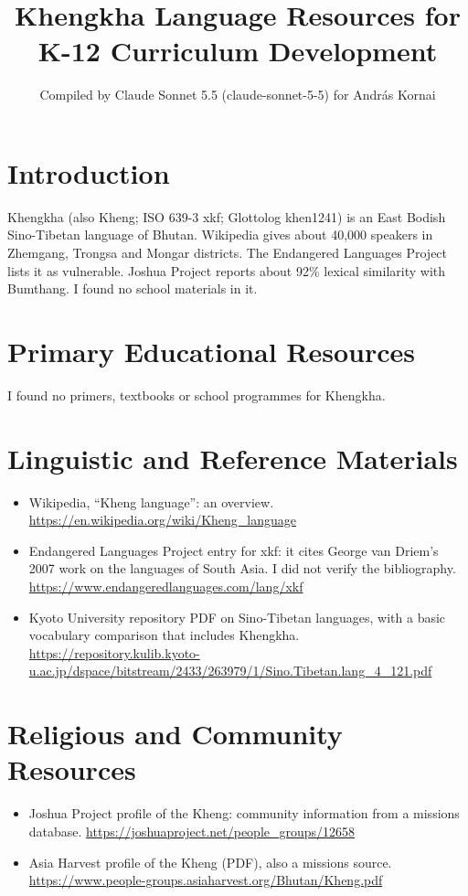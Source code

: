 \documentclass[12pt]{article}
\title{Khengkha Language Resources for K-12 Curriculum Development}
\author{Compiled by Claude Sonnet 5.5 (claude-sonnet-5-5) for Andr\'as Kornai}
\date{}
\begin{document}
\maketitle

\section{Introduction}
Khengkha (also Kheng; ISO 639-3 xkf; Glottolog khen1241) is an East Bodish Sino-Tibetan language of Bhutan. Wikipedia gives about 40,000 speakers in Zhemgang, Trongsa and Mongar districts. The Endangered Languages Project lists it as vulnerable. Joshua Project reports about 92\% lexical similarity with Bumthang. I found no school materials in it.

\section{Primary Educational Resources}
I found no primers, textbooks or school programmes for Khengkha.

\section{Linguistic and Reference Materials}
\begin{itemize}
\item Wikipedia, ``Kheng language'': an overview. \url{https://en.wikipedia.org/wiki/Kheng_language}
\item Endangered Languages Project entry for xkf: it cites George van Driem's 2007 work on the languages of South Asia. I did not verify the bibliography. \url{https://www.endangeredlanguages.com/lang/xkf}
\item Kyoto University repository PDF on Sino-Tibetan languages, with a basic vocabulary comparison that includes Khengkha. \url{https://repository.kulib.kyoto-u.ac.jp/dspace/bitstream/2433/263979/1/Sino.Tibetan.lang_4_121.pdf}
\end{itemize}

\section{Religious and Community Resources}
\begin{itemize}
\item Joshua Project profile of the Kheng: community information from a missions database. \url{https://joshuaproject.net/people_groups/12658}
\item Asia Harvest profile of the Kheng (PDF), also a missions source. \url{https://www.people-groups.asiaharvest.org/Bhutan/Kheng.pdf}
\end{itemize}
\end{document}
